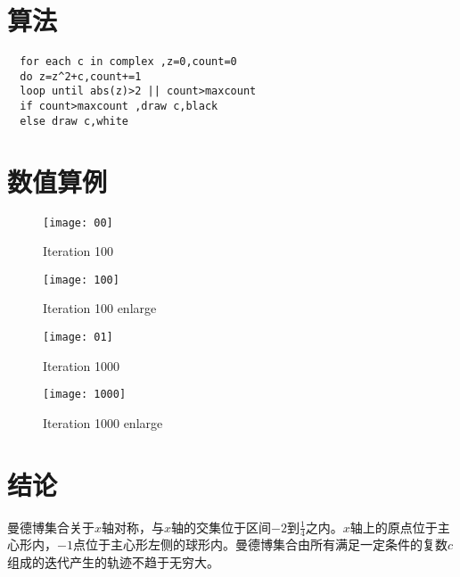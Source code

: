 \documentclass{ctexart}
\begin{document}
\section{算法}
\begin{verbatim}
  for each c in complex ,z=0,count=0
  do z=z^2+c,count+=1
  loop until abs(z)>2 || count>maxcount
  if count>maxcount ,draw c,black
  else draw c,white
\end{verbatim}

\section{数值算例}
\begin{figure}[H]
  \centering
  \begin{minipage}[t]{0.48\textwidth}
    \centering
    \texttt{[image: 00]}
    \caption{Iteration 100}
  \end{minipage}
  \begin{minipage}[t]{0.48\textwidth}
    \centering
    \texttt{[image: 100]}
    \caption{Iteration 100 enlarge}
  \end{minipage}
\end{figure}

\begin{figure}[H]
  \centering
  \begin{minipage}[t]{0.48\textwidth}
    \centering
    \texttt{[image: 01]}
    \caption{Iteration 1000}
  \end{minipage}
  \begin{minipage}[t]{0.48\textwidth}
    \centering
    \texttt{[image: 1000]}
    \caption{Iteration 1000 enlarge}
  \end{minipage}
\end{figure}


\section{结论}
曼德博集合关于$x$轴对称，与$x$轴的交集位于区间$-2$到$\frac{1}{4}$之内。$x$轴上的原点位于主心形内，$-1$点位于主心形左侧的球形内。曼德博集合由所有满足一定条件的复数$c$组成的迭代产生的轨迹不趋于无穷大。


\end{document}
